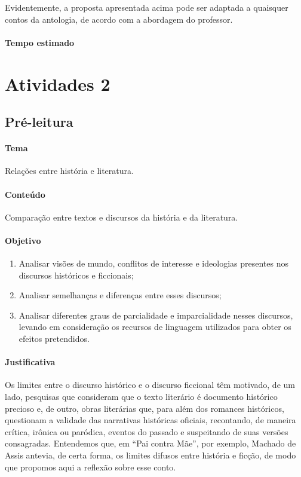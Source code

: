 \documentclass[11pt]{extarticle}
\begin{document}
Evidentemente, a proposta apresentada acima pode ser adaptada a
quaisquer contos da antologia, de acordo com a abordagem do professor.

\paragraph{Tempo estimado}

\section{Atividades 2}

\subsection{Pré-leitura}

%
%

\paragraph{Tema} Relações entre história e literatura.

\paragraph{Conteúdo} Comparação entre textos e discursos da história e da
literatura.

\paragraph{Objetivo} 
\begin{enumerate}
\item
Analisar visões de mundo, conflitos de interesse e
ideologias presentes nos discursos históricos e ficcionais; 
\item
Analisar semelhanças e diferenças entre esses discursos; 
\item
Analisar diferentes
graus de parcialidade e imparcialidade nesses discursos, levando em
consideração os recursos de linguagem utilizados para obter os efeitos
pretendidos.
\end{enumerate}

\paragraph{Justificativa} Os limites entre o discurso histórico e o
discurso ficcional têm motivado, de um lado, pesquisas que consideram
que o texto literário é documento histórico precioso e, de outro, obras
literárias que, para além dos romances históricos, questionam a validade
das narrativas históricas oficiais, recontando, de maneira crítica,
irônica ou paródica, eventos do passado e suspeitando de suas versões
consagradas. Entendemos que, em ``Pai contra Mãe'', por exemplo, Machado
de Assis antevia, de certa forma, os limites difusos entre história e
ficção, de modo que propomos aqui a reflexão sobre esse conto.
\end{document}
